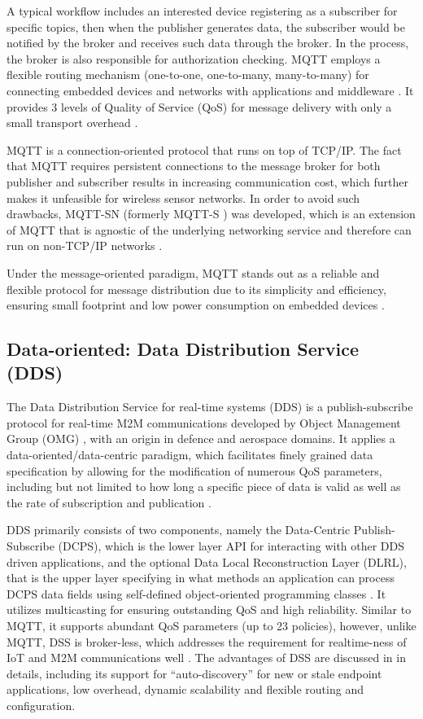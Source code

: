 A typical workflow includes an interested device registering as a subscriber for specific topics, then when the publisher generates data, the subscriber would be notified by the broker and receives such data through the broker. In the process, the broker is also responsible for authorization checking. MQTT employs a flexible routing mechanism (one-to-one, one-to-many, many-to-many) for connecting embedded devices and networks with applications and middleware \cite{7123563}. It provides 3 levels of Quality of Service (QoS) for message delivery with only a small transport overhead \autocite{mqtt_protocol}.

MQTT is a connection-oriented protocol that runs on top of TCP/IP. The fact that MQTT requires persistent connections to the message broker for both publisher and subscriber results in increasing communication cost, which further makes it unfeasible for wireless sensor networks. In order to avoid such drawbacks, MQTT-SN (formerly MQTT-S \cite{4554519}) was developed, which is an extension of MQTT that is agnostic of the underlying networking service and therefore can run on non-TCP/IP networks \autocite{mqtt-sn}.

Under the message-oriented paradigm, MQTT stands out as a reliable and flexible protocol for message distribution due to its simplicity and efficiency, ensuring small footprint and low power consumption on embedded devices \autocite{6918928}. 

\subsection{Data-oriented: Data Distribution Service (DDS)}

The Data Distribution Service for real-time systems (DDS) is a publish-subscribe protocol for real-time M2M communications developed by Object Management Group (OMG) \autocite{dds}, with an origin in defence and aerospace domains. It applies a data-oriented/data-centric paradigm, which facilitates finely grained data specification by allowing for the modification of numerous QoS parameters, including but not limited to how long a specific piece of data is valid as well as the rate of subscription and publication \autocite{pardo2005introduction}.

DDS primarily consists of two components, namely the Data-Centric Publish-Subscribe (DCPS), which is the lower layer API for interacting with other DDS driven applications, and the optional Data Local Reconstruction Layer (DLRL), that is the upper layer specifying in what methods an application can process DCPS data fields using self-defined object-oriented programming classes \autocite{pardo2005introduction}. It utilizes multicasting for ensuring outstanding QoS and high reliability. Similar to MQTT, it supports abundant QoS parameters (up to 23 policies), however, unlike MQTT, DSS is broker-less, which addresses the requirement for realtime-ness of IoT and M2M communications well \cite{7123563}. The advantages of DSS are discussed in \cite{pardo2005introduction} in details, including its support for “auto-discovery” for new or stale endpoint applications, low overhead, dynamic scalability and flexible routing and configuration.

